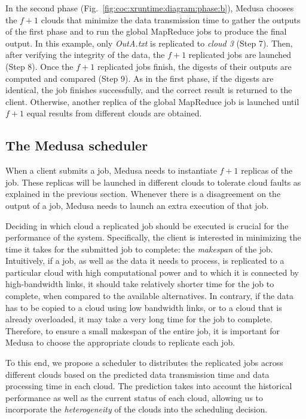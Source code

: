 \documentclass[10pt, conference, compsocconf]{IEEEtran}
\begin{document}
In the second phase (Fig.~\ref{fig:coc:xruntime:diagram:phase:b}), Medusa chooses the $f+1$ clouds that minimize the data transmission time to gather the outputs of the first phase and to run the global MapReduce jobs to produce the final output.
In this example, only \emph{OutA.txt} is replicated to \emph{cloud 3} (Step 7).
Then, after verifying the integrity of the data, the $f+1$ replicated jobs are launched (Step 8).
Once the $f+1$ replicated jobs finish, the digests of their outputs are computed and compared (Step 9).
As in the first phase, if the digests are identical, the job finishes successfully, and the correct result is returned to the client.
Otherwise, another replica of the global MapReduce job is launched until $f+1$ equal results from different clouds are obtained.

\subsection{The Medusa scheduler}
\label{subsec:solution:scheduler}

When a client submits a job, Medusa needs to instantiate $f+1$ replicas of the job.
These replicas will be launched in different clouds to tolerate cloud faults as explained in the previous section.
Whenever there is a disagreement on the output of a job, Medusa needs to launch an extra execution of that job.

Deciding in which cloud a replicated job should be executed is crucial for the performance of the system. Specifically, the client is interested in minimizing the time it takes for the submitted job to complete: the \emph{makespan} of the job. Intuitively, if a job, as well as the data it needs to process, is replicated to a particular cloud with high computational power and to which it is connected by high-bandwidth links, it should take relatively shorter time for the job to complete, when compared to the available alternatives. In contrary, if the data has to be copied to a cloud using low bandwidth links, or to a cloud that is already overloaded, it may take a very long time for the job to complete. Therefore, to ensure a small makespan of the entire job, it is important for Medusa to choose the appropriate clouds to replicate each job.

To this end, we propose a scheduler to distributes the replicated jobs across different clouds based on the predicted data transmission time and data processing time in each cloud. The prediction takes into account the historical performance as well as the current status of each cloud, allowing us to incorporate the \emph{heterogeneity} of the clouds into the scheduling decision.
\end{document}
